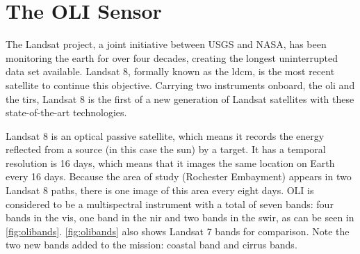 




\section{The OLI Sensor}
The Landsat project, a joint initiative between USGS and NASA, has been monitoring the earth for over four decades, creating the longest uninterrupted data set available. Landsat 8, formally known as the \gls{ldcm}, is the most recent satellite to continue this objective. Carrying two instruments onboard, the \acrfull{oli} and the \acrfull{tirs}, Landsat 8 is the first of a new generation of Landsat satellites with these state-of-the-art technologies. 

Landsat 8 is an optical passive satellite, which means it records the energy reflected from a source (in this case the sun) by a target. It has a temporal resolution is 16 days, which means that it images the same location on Earth every 16 days. Because the area of study (Rochester Embayment) appears in two Landsat 8 paths, there is one image of this area every eight days. OLI is considered to be a multispectral instrument with a total of seven bands: four bands in the \gls{vis}, one band in the \acrfull{nir} and two bands in the \acrfull{swir}, as can be seen in \autoref{fig:olibands}. \autoref{fig:olibands} also shows Landsat 7 bands for comparison. Note the two new bands added to the mission: coastal band and cirrus bands.

